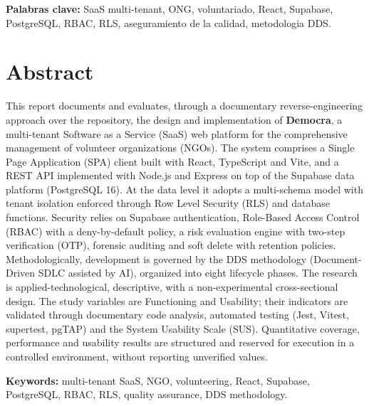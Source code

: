 \documentclass[11pt,a4paper,oneside]{report}
\begin{document}
\vspace{0.3cm}
\noindent\textbf{Palabras clave:} SaaS multi-tenant, ONG, voluntariado, React, Supabase, PostgreSQL,
RBAC, RLS, aseguramiento de la calidad, metodologia DDS.

\chapter*{Abstract}
This report documents and evaluates, through a documentary reverse-engineering approach over the
repository, the design and implementation of \textbf{Democra}, a multi-tenant Software as a Service
(SaaS) web platform for the comprehensive management of volunteer organizations (NGOs). The system
comprises a Single Page Application (SPA) client built with React, TypeScript and Vite, and a REST
API implemented with Node.js and Express on top of the Supabase data platform (PostgreSQL 16). At the
data level it adopts a multi-schema model with tenant isolation enforced through Row Level Security
(RLS) and database functions. Security relies on Supabase authentication, Role-Based Access Control
(RBAC) with a deny-by-default policy, a risk evaluation engine with two-step verification (OTP),
forensic auditing and soft delete with retention policies. Methodologically, development is governed
by the DDS methodology (Document-Driven SDLC assisted by AI), organized into eight lifecycle
phases. The research is applied-technological, descriptive, with a non-experimental cross-sectional
design. The study variables are Functioning and Usability; their indicators are validated through
documentary code analysis, automated testing (Jest, Vitest, supertest, pgTAP) and the System
Usability Scale (SUS). Quantitative coverage, performance and usability results are structured and
reserved for execution in a controlled environment, without reporting unverified values.

\vspace{0.3cm}
\noindent\textbf{Keywords:} multi-tenant SaaS, NGO, volunteering, React, Supabase, PostgreSQL, RBAC,
RLS, quality assurance, DDS methodology.

\newpage \thispagestyle{empty} \tableofcontents
\newpage \thispagestyle{empty} \listoffigures
\newpage \thispagestyle{empty} \listoftables
\newpage

\end{document}

